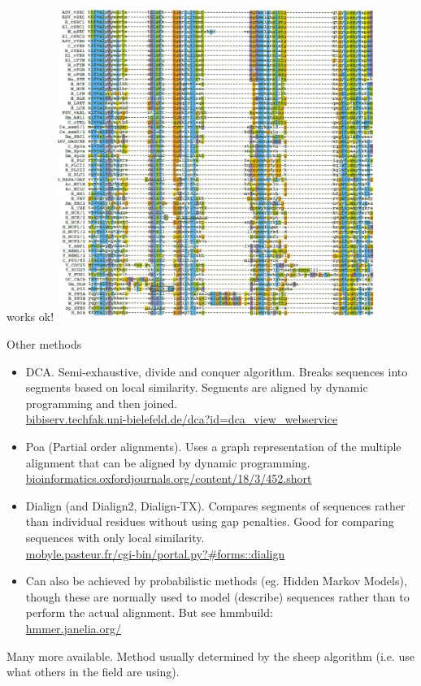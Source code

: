 \documentclass[pdf]{beamer}
\begin{document}
\begin{frame}{works ok!}
  \includegraphics[width=0.8\textwidth]{images/clustal_alignment}
\end{frame}

\begin{frame}{Other methods}
  \footnotesize
  \begin{itemize}
  \item DCA. Semi-exhaustive, divide and conquer algorithm. Breaks sequences
    into segments based on local similarity. Segments are aligned by dynamic
    programming and then joined.\\
    \href{http://bibiserv.techfak.uni-bielefeld.de/dca?id=dca\_view\_webservice}
    {bibiserv.techfak.uni-bielefeld.de/dca?id=dca\_view\_webservice}
  \item Poa (Partial order alignments). Uses a graph representation of the
    multiple alignment that can be aligned by dynamic programming.\\
    \href{http://bioinformatics.oxfordjournals.org/content/18/3/452.short}
    {bioinformatics.oxfordjournals.org/content/18/3/452.short}
  \item Dialign (and Dialign2, Dialign-TX). Compares segments of sequences rather 
    than individual residues without using gap penalties. Good for comparing
    sequences with only local similarity.\\
   \href{http://mobyle.pasteur.fr/cgi-bin/portal.py?\#forms::dialign}
   {mobyle.pasteur.fr/cgi-bin/portal.py?\#forms::dialign}
  \item Can also be achieved by probabilistic methods (eg. Hidden Markov Models),
    though these are normally used to model (describe) sequences rather than to
    perform the actual alignment. But see hmmbuild:\\
    \href{http://hmmer.janelia.org/}{hmmer.janelia.org/}
  \end{itemize}

  Many more available. Method usually determined by the sheep algorithm
  (i.e. use what others in the field are using).
  
\end{frame}
\end{document}
